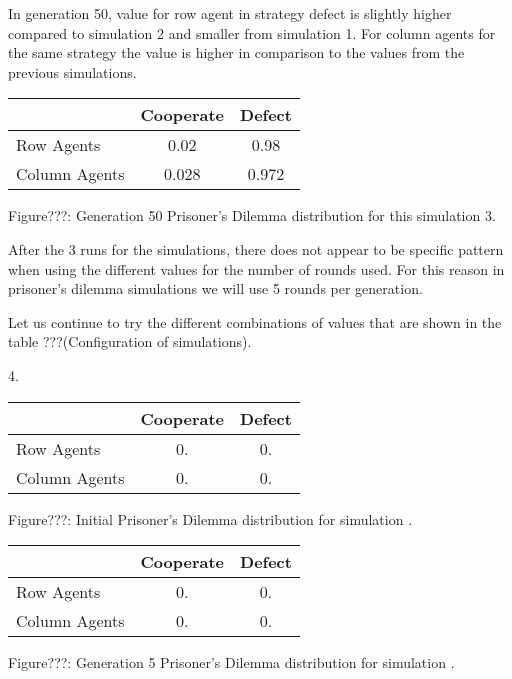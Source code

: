 \documentclass{article}
\begin{document}
In generation 50, value for row agent in strategy defect is slightly higher compared to simulation 2  and smaller from simulation 1. For column agents for the same strategy the value is higher in comparison to the values from the previous simulations.
\begin{center}
\begin{tabular}{|l|c|c|}
\hline
& Cooperate & Defect \\ 
\hline
Row Agents & 0.02 & 0.98\\
\hline
Column Agents & 0.028 & 0.972\\
\hline
\end{tabular}
\end{center}
\begin{center}
Figure???: Generation 50 Prisoner’s Dilemma distribution for this simulation 3.
\end{center}

After the 3 runs for the simulations, there does not appear to be specific pattern when using the different values for the number of rounds used. For this reason in prisoner's dilemma simulations we will use 5 rounds per generation.

Let us continue to try the different combinations of values that are shown in the table ???(Configuration of simulations). 

4.

\begin{center}
\begin{tabular}{|l|c|c|}
\hline
& Cooperate & Defect \\ 
\hline
Row Agents & 0. & 0.\\
\hline
Column Agents & 0. & 0.\\
\hline
\end{tabular}
\end{center}
\begin{center}
Figure???: Initial Prisoner’s Dilemma distribution for simulation .
\end{center}


\begin{center}
\begin{tabular}{|l|c|c|}
\hline
& Cooperate & Defect \\ 
\hline
Row Agents & 0. & 0.\\
\hline
Column Agents & 0. & 0.\\
\hline
\end{tabular}
\end{center}
\begin{center}
Figure???: Generation 5 Prisoner’s Dilemma distribution for simulation .
\end{center}
\end{document}
